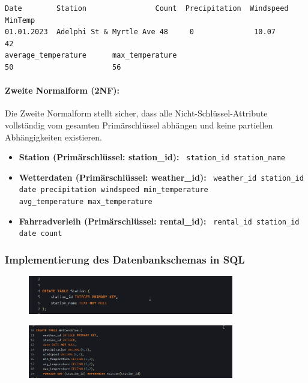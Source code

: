 \documentclass[a4paper,12pt]{article}
\begin{document}
\begin{verbatim}
Date        Station                Count  Precipitation  Windspeed  MinTemp   
01.01.2023  Adelphi St & Myrtle Ave 48     0              10.07      42       
average_temperature      max_temperature                
50                       56
\end{verbatim}

\paragraph{Zweite Normalform (2NF):}
Die Zweite Normalform stellt sicher, dass alle Nicht-Schlüssel-Attribute vollständig vom gesamten Primärschlüssel abhängen und keine partiellen Abhängigkeiten existieren.

\begin{itemize}
    \item \textbf{Station (Primärschlüssel: station\_id):}
    \texttt{
    station\_id   station\_name
    }
    \item \textbf{Wetterdaten (Primärschlüssel: weather\_id):}
    \texttt{
    weather\_id   station\_id   date   precipitation   windspeed   min\_temperature \\
    avg\_temperature   max\_temperature
    }
    \item \textbf{Fahrradverleih (Primärschlüssel: rental\_id):}
    \texttt{
    rental\_id   station\_id   date   count
    }
\end{itemize}


\subsubsection{Implementierung des Datenbankschemas in SQL}

\begin{figure}[h!]
\centering
\includegraphics[width=0.8\textwidth]{20241201_19513817.png}  %
\label{fig:bild1}
\end{figure}

\begin{figure}[h!]
\centering
\includegraphics[width=0.8\textwidth]{20241201_19514551.png}  %
\label{fig:bild2}
\end{figure}
\end{document}
